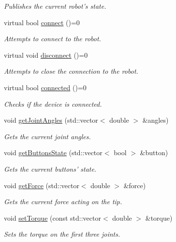 \begin{DoxyCompactItemize}
\begin{DoxyCompactList}\small\item\em Publishes the current robot's state. \end{DoxyCompactList}\item 
virtual bool \hyperlink{classOmniBase_a60f376af41716a697ea79753160c3ca7}{connect} ()=0
\begin{DoxyCompactList}\small\item\em Attempts to connect to the robot. \end{DoxyCompactList}\item 
virtual void \hyperlink{classOmniBase_a7ba2a80063858d1cf7d5b03f9796ced4}{disconnect} ()=0
\begin{DoxyCompactList}\small\item\em Attempts to close the connection to the robot. \end{DoxyCompactList}\item 
virtual bool \hyperlink{classOmniBase_a22df750b9563aa7956950698e7463660}{connected} ()=0
\begin{DoxyCompactList}\small\item\em Checks if the device is connected. \end{DoxyCompactList}\item 
void \hyperlink{classOmniBase_aad2a1a9f26e79fd83b66aa8a0687b2fe}{get\-Joint\-Angles} (std\-::vector$<$ double $>$ \&angles)
\begin{DoxyCompactList}\small\item\em Gets the current joint angles. \end{DoxyCompactList}\item 
void \hyperlink{classOmniBase_a81bc07c9e555ffd56c2e9875fb02a5f3}{get\-Buttons\-State} (std\-::vector$<$ bool $>$ \&button)
\begin{DoxyCompactList}\small\item\em Gets the current buttons' state. \end{DoxyCompactList}\item 
void \hyperlink{classOmniBase_a2063df1014b3929d67c651fd72254d9f}{get\-Force} (std\-::vector$<$ double $>$ \&force)
\begin{DoxyCompactList}\small\item\em Gets the current force acting on the tip. \end{DoxyCompactList}\item 
void \hyperlink{classOmniBase_a6cae32aaf35f41719956c1f4e58f15e0}{set\-Torque} (const std\-::vector$<$ double $>$ \&torque)
\begin{DoxyCompactList}\small\item\em Sets the torque on the first three joints. \end{DoxyCompactList}\item 

\end{DoxyCompactItemize}
